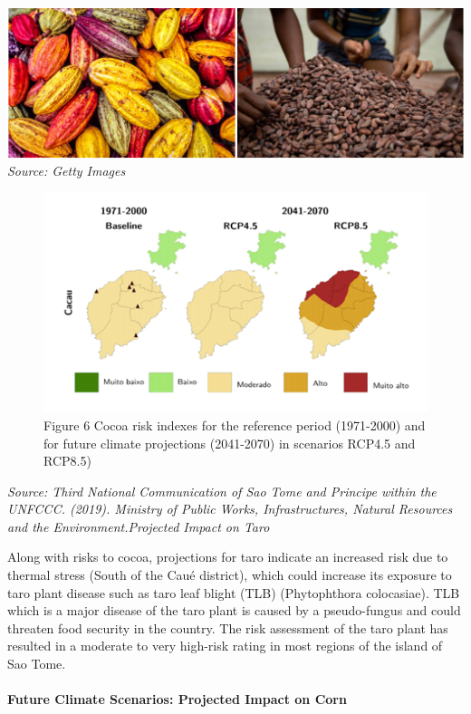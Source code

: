 \documentclass[
]{book}
\begin{document}
\includegraphics{images/cocoa_getty.png}
\emph{Source: Getty Images}

\begin{figure}
\centering
\includegraphics{images/cocoa_risk.png}
\caption{Figure 6 Cocoa risk indexes for the reference period (1971-2000) and for future climate projections (2041-2070) in scenarios RCP4.5 and RCP8.5)}
\end{figure}

\emph{Source: Third National Communication of Sao Tome and Principe within the UNFCCC. (2019). Ministry of Public Works, Infrastructures, Natural Resources and the Environment.Projected Impact on Taro}

Along with risks to cocoa, projections for taro indicate an increased risk due to thermal stress (South of the Caué district), which could increase its exposure to taro plant disease such as taro leaf blight (TLB) (Phytophthora colocasiae). TLB which is a major disease of the taro plant is caused by a pseudo-fungus and could threaten food security in the country. The risk assessment of the taro plant has resulted in a moderate to very high-risk rating in most regions of the island of Sao Tome.

\hypertarget{future-climate-scenarios-projected-impact-on-corn-1}{%
\paragraph{Future Climate Scenarios: Projected Impact on Corn}\label{future-climate-scenarios-projected-impact-on-corn-1}}
\end{document}
